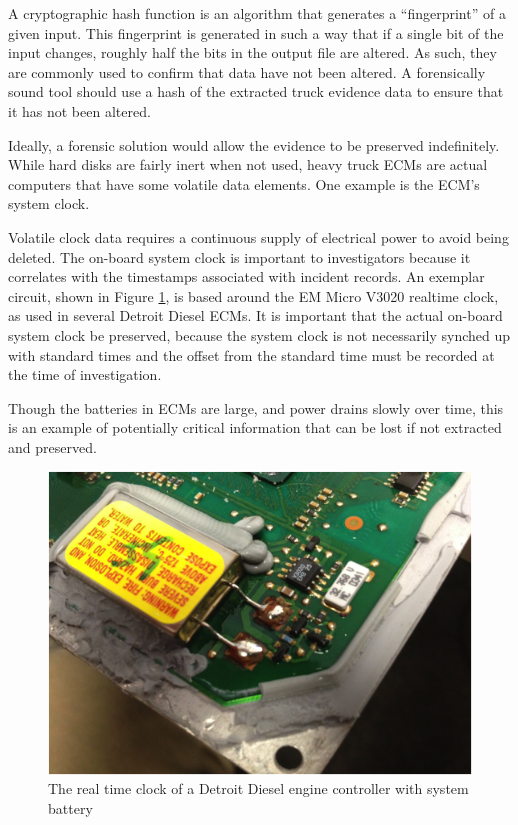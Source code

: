 A cryptographic hash function is an algorithm that generates a “fingerprint” of a given input. This fingerprint is generated in such a way that if a single bit of the input changes, 
roughly half the bits in the output file are altered\cite{schneier1996}. As such, they are commonly used to confirm that data have not been altered. A forensically sound tool should use a hash of 
the extracted truck evidence data to ensure that it has not been altered.


Ideally, a forensic solution would allow the evidence to be preserved indefinitely. While hard disks are fairly inert when not used, heavy truck ECMs are actual computers that 
have some volatile data elements. One example is the ECM's system clock.

Volatile clock data requires a continuous supply of electrical power to avoid being deleted. The on-board 
system clock is important to investigators because it correlates with the timestamps associated with incident records. An exemplar circuit, shown in Figure \ref{fig:clockbatt}, is based around 
the EM Micro V3020 realtime clock, as used in several Detroit Diesel ECMs.  It is important that the actual on-board system clock be preserved, because the system clock is not necessarily synched 
up with standard times and the offset from the standard time must be recorded at the time of investigation.

Though the batteries in ECMs are large, and power drains slowly over time, this is an example of potentially critical information that can be lost if not extracted and preserved.

\begin{figure}[h]
  \centering
  \includegraphics{clockbatt}
  \caption{The real time clock of a Detroit Diesel engine controller with system battery}
  \label{fig:clockbatt}

\end{figure}


